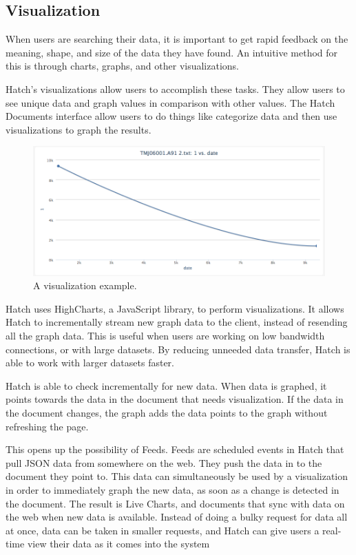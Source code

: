 \subsection{Visualization}

When users are searching their data, it is important to get rapid feedback on the meaning,
shape, and size of the data they have found.  An intuitive method for this is through
charts, graphs, and other visualizations.

Hatch's visualizations allow users to accomplish these tasks. They allow users
to see unique data and graph values in comparison with other values. The Hatch
Documents interface allow users to do things like categorize data and then use
visualizations to graph the results.

\begin{figure}[h]
	\begin{center}
	\includegraphics[width=120mm]{images/viz_ex1}
	\caption{A visualization example.} 
	\label{viz_ex1}
	\end{center}
\end{figure}

Hatch uses HighCharts, a JavaScript library, to perform visualizations. It
allows Hatch to incrementally stream new graph data to the client, instead of
resending all the graph data. This is useful when users are working on low
bandwidth connections, or with large datasets. By reducing unneeded data 
transfer, Hatch is able to work with larger datasets faster.

Hatch is able to check incrementally for new data. When data is graphed, it points towards the 
data in the document that needs visualization. If the data in the document changes,
the graph adds the data points to the graph without refreshing the page.

This opens up the possibility of Feeds. Feeds are scheduled events in Hatch that pull
JSON data from somewhere on the web. They push the data in to the document they point
to. This data can simultaneously be used by a visualization in order to immediately graph
the new data, as soon as a change is detected in the document.
The result is Live Charts, and documents that sync with data on the web when new data is 
available. Instead of doing a bulky request for data all at once, data can be taken
in smaller requests, and Hatch can give users a real-time view their data as it comes
into the system
